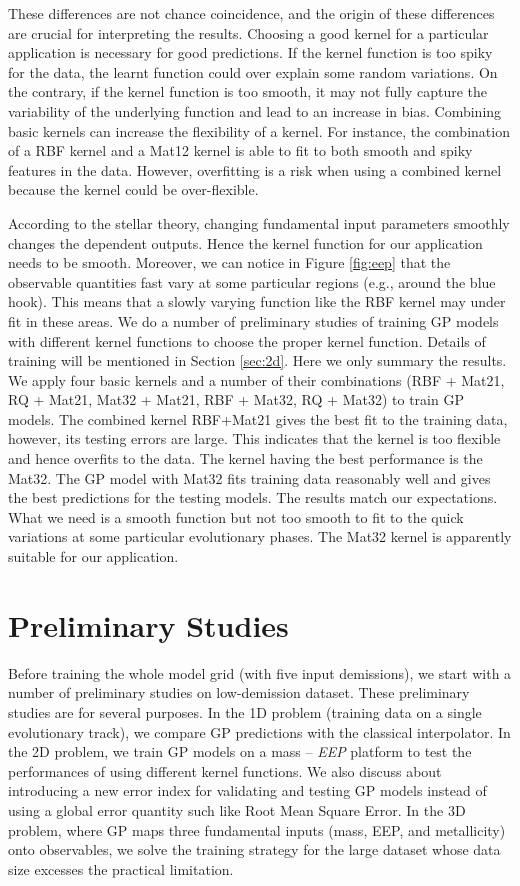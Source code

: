 %
These differences are not chance coincidence, and the origin of these differences are crucial for interpreting the results. Choosing a good kernel for a particular application is necessary for good predictions. If the kernel function is too spiky for the data, the learnt function could over explain some random variations. On the contrary, if the kernel function is too smooth, it may not fully capture the variability of the underlying function and lead to an increase in bias.
%
Combining basic kernels can increase the flexibility of a kernel. For instance, the combination of a RBF kernel and a Mat12 kernel is able to fit to both smooth and spiky features in the data. However,  overfitting is a risk when using a combined kernel because the kernel could be over-flexible.

According to the stellar theory, changing fundamental input parameters smoothly changes the dependent outputs. Hence the kernel function for our application needs to be smooth. Moreover, we can notice in Figure \ref{fig:eep} that the observable quantities fast vary at some particular regions (e.g., around the blue hook). This means that a slowly varying function like the RBF kernel may under fit in these areas. We do a number of preliminary studies of training GP models with different kernel functions to choose the proper kernel function. Details of training will be mentioned in Section \ref{sec:2d}. Here we only summary the results. 
%
We apply four basic kernels and a number of their combinations (RBF + Mat21, RQ + Mat21, Mat32 + Mat21, RBF + Mat32, RQ + Mat32) to train GP models. The combined kernel RBF+Mat21 gives the best fit to the training data, however, its testing errors are large. This indicates that the kernel is too flexible and hence overfits to the data.  
%
The kernel having the best performance is the Mat32. The GP model with Mat32 fits training data reasonably well and gives the best predictions for the testing models. 
%
The results match our expectations. What we need is a smooth function but not too smooth to fit to the quick variations at some particular evolutionary phases. The Mat32 kernel is apparently suitable for our application. 

\section{Preliminary Studies}\label{examples}

Before training the whole model grid (with five input demissions), we start with a number of preliminary studies on low-demission dataset. 
%
These preliminary studies are for several purposes. In the 1D problem (training data on a single evolutionary track), we compare GP predictions with the classical interpolator. In the 2D problem, we train GP models on a mass -- {\it EEP} platform to test the performances of using different kernel functions. We also discuss about introducing a new error index for validating and testing GP models instead of using a global error quantity such like Root Mean Square Error.
%
In the 3D problem, where GP maps three fundamental inputs (mass, EEP, and metallicity) onto observables, we solve the training strategy for the large dataset whose data size excesses the practical limitation. 

